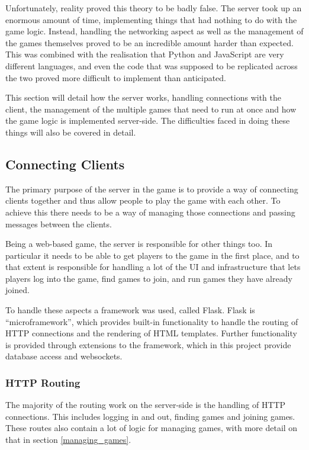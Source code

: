 Unfortunately, reality proved this theory to be badly false. The server took up an enormous amount of time, implementing things that had nothing to do with the game logic. Instead, handling the networking aspect as well as the management of the games themselves proved to be an incredible amount harder than expected. This was combined with the realisation that Python and JavaScript are very different languages, and even the code that was supposed to be replicated across the two proved more difficult to implement than anticipated.

This section will detail how the server works, handling connections with the client, the management of the multiple games that need to run at once and how the game logic is implemented server-side. The difficulties faced in doing these things will also be covered in detail.

\subsection{Connecting Clients}
The primary purpose of the server in the game is to provide a way of connecting clients together and thus allow people to play the game with each other. To achieve this there needs to be a way of managing those connections and passing messages between the clients.

Being a web-based game, the server is responsible for other things too. In particular it needs to be able to get players to the game in the first place, and to that extent is responsible for handling a lot of the UI and infrastructure that lets players log into the game, find games to join, and run games they have already joined.

To handle these aspects a framework was used, called Flask. Flask is ``microframework'', which provides built-in functionality to handle the routing of HTTP connections and the rendering of HTML templates. Further functionality is provided through extensions to the framework, which in this project provide database access and websockets.

\subsubsection{HTTP Routing}
The majority of the routing work on the server-side is the handling of HTTP connections. This includes logging in and out, finding games and joining games. These routes also contain a lot of logic for managing games, with more detail on that in section \ref{managing_games}.

